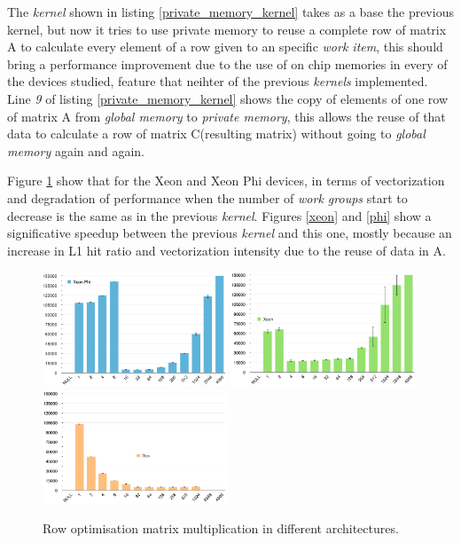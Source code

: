 \par{The \emph{kernel} shown in listing \ref{private_memory_kernel} takes as a 
    base the previous kernel, but now it tries to use private memory to reuse 
    a complete row of matrix A to calculate every element of a row given to an specific
    \emph{work item}, this should bring a performance improvement due
    to the use of on chip memories in every of the devices studied, feature that 
    neihter of the previous \emph{kernels} implemented. Line \emph{9} of 
    listing \ref{private_memory_kernel} shows the copy of 
    elements of one row of matrix A from \emph{global memory} to
    \emph{private memory}, this allows the reuse of that data to calculate 
    a row of matrix C(resulting matrix) without going to \emph{global memory}
    again and again.} 

\par{Figure \ref{Rows} show that for the Xeon and Xeon Phi devices, 
    in terms of vectorization and degradation
    of performance when the number of \emph{work groups} start to decrease is the
    same as in the previous \emph{kernel}. Figures \ref{xeon} and \ref{phi} show
    a significative speedup between the previous \emph{kernel} and this one, 
    mostly because an increase in L1 hit ratio and vectorization intensity due to
    the reuse of data in A.}

\begin{figure}[!h]
    \centering
    \includegraphics[width=0.49\textwidth]{figures/opt2_phi.png}
    \includegraphics[width=0.49\textwidth]{figures/opt2_cpu.png}
    \includegraphics[width=0.49\textwidth]{figures/opt2_gpu.png}
    \caption{Row optimisation matrix multiplication in different architectures.}
    \label{Rows}
\end{figure}
    
